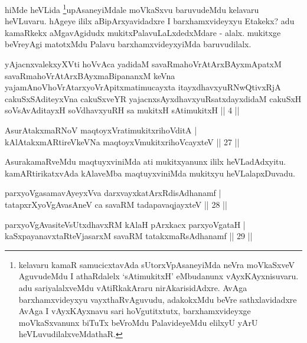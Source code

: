 \begin{artha}
hiMde heVLida \footnote{kelavaru kamaR samucicxtavAda sUtorxVpAsaneyiMda neVra moVkaSxveV AguvudeMdu I athaRdalelx `sAtimukitxH' eMbudanunx vAyxKAyxnisuvaru. adu sariyalalxveMdu vAtiRkakAraru nirAkarisidAdxre. AvAga barxhamxvideyxyu vayxthaRvAguvudu, adakokxMdu beVre sathxlavidadxre AvAga I vAyxKAyxnavu sari hoVgutitxtutx, barxhamxvideyxge moVkaSxvanunx biTuTx beVroMdu PalavideyeMdu elilxyU yArU heVLuvudilalxveMdathaR.}upAsaneyiMdale moVkaSxvu baruvudeMdu kelavaru heVLuvaru. hAgeye ililx aBipArxyavidadxre I barxhamxvideyxyu Etakekx? adu kamaRkekx aMgavAgidudx mukitxPalavuLaLxdedxMdare - alalx. mukitxge beVreyAgi matotxMdu Palavu barxhamxvideyxyiMda baruvudilalx.
\end{artha}


\begin{kandikeshl}
yAjacnxvalekxyXVti hoVvAca yadidaM savaRmahoVrAtArxBAyxmApatxM savaRmahoVrAtArxBAyxmaBipananxM keVna yajamAnoV\s hoVrAtarxyoVrApitxmatimucayxta itayxdhavxyuRNwQtivxRjA cakuSxSAditeyxVna cakuSxveYR yajacnxsAyxdhavxyuRsatxdayxdidaM cakuSxH soV\s sAvAditayxH soV\s dhavxyuRH sa mukitxH sAtimukitxH || 4 ||
\end{kandikeshl}

\begin{shl}
AsurAtakxmaRNoV maqtoyxVratimukitxrihoVditA |\\
kAlAtakxmARtireVkeVNa maqtoyxVmukitxrihoVcayxteV \hfill || 27 ||
\end{shl}

\begin{artha}
AsurakamaRveMdu maqtuyxviniMda ati mukitxyanunx ililx heVLadAdxyitu. kamARtirikatxvAda kAlaveMba maqtuyxviniMda mukitxyu heVLalapxDuvadu.
\end{artha}


\begin{shl}
parxyoVgasamavAyeyxVva darxvayxkatArxRdisAdhanamf |\\
tatapxrXyoVgAvasAneV ca savaRM tadapavaqjayxteV \hfill || 28 ||
\end{shl}

\begin{shl}
parxyoVgAvasiteVsUtxdhavxRM kAlaH pArxkacx parxyoVgataH |\\
kaSxpayanavxtaRteVjasarxM savaRM tatakxmaRsAdhanamf \hfill || 29 || 
\end{shl}

